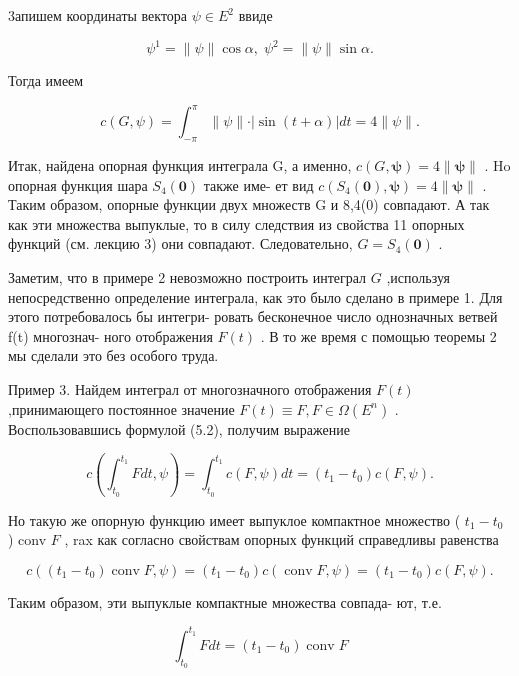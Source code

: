\documentclass[8pt]{extarticle}
\begin{document}
3апишем координаты вектора \(\psi  \in  {E}^{2}\) ввиде

\[
{\psi }^{1} = \parallel \psi \parallel \cos \alpha ,\;{\psi }^{2} = \parallel \psi \parallel \sin \alpha .
\]

Тогда имеем

\[
c\left( {G,\psi }\right)  = {\int }_{-\pi }^{\pi }\parallel \psi \parallel  \cdot  \left| {\sin \left( {t + \alpha }\right) }\right| {dt} = 4\parallel \psi \parallel .
\]

Итак, найдена опорная функция интеграла G, а именно, \(c\left( {G,\mathbf{\psi }}\right)  = 4\parallel \mathbf{\psi }\parallel\) . Ho опорная функция шара \({S}_{4}\left( \mathbf{0}\right)\) также име- ет вид \(c\left( {{S}_{4}\left( \mathbf{0}\right) ,\mathbf{\psi }}\right)  = 4\parallel \mathbf{\psi }\parallel\) . Таким образом, опорные функции двух множеств G и 8,4(0) совпадают. А так как эти множества выпуклые, то в силу следствия из свойства 11 опорных функций (см. лекцию 3) они совпадают. Следовательно, \(G = {S}_{4}\left( \mathbf{0}\right)\) .

Заметим, что в примере 2 невозможно построить интеграл \(G\) ,используя непосредственно определение интеграла, как это было сделано в примере 1. Для этого потребовалось бы интегри- ровать бесконечное число однозначных ветвей f(t) многознач- ного отображения \(F\left( t\right)\) . В то же время с помощью теоремы 2 мы сделали это без особого труда.

Пример 3. Найдем интеграл от многозначного отображения \(F\left( t\right)\) ,принимающего постоянное значение \(F\left( t\right)  \equiv  F,F \in  \Omega \left( {E}^{n}\right)\) . Воспользовавшись формулой (5.2), получим выражение

\[
c\left( {{\int }_{{t}_{0}}^{{t}_{1}}{Fdt},\psi }\right)  = {\int }_{{t}_{0}}^{{t}_{1}}c\left( {F,\psi }\right) {dt} = \left( {{t}_{1} - {t}_{0}}\right) c\left( {F,\psi }\right) .
\]

Но такую же опорную функцию имеет выпуклое компактное множество ( \({t}_{1} - {t}_{0}\) ) conv \(F\) , rax как согласно свойствам опорных функций справедливы равенства

\[
c\left( {\left( {{t}_{1} - {t}_{0}}\right) \operatorname{conv}F,\psi }\right)  = \left( {{t}_{1} - {t}_{0}}\right) c\left( {\operatorname{conv}F,\psi }\right)  = \left( {{t}_{1} - {t}_{0}}\right) c\left( {F,\psi }\right) .
\]

Таким образом, эти выпуклые компактные множества совпада- ют, т.е.

\[
{\int }_{{t}_{0}}^{{t}_{1}}{Fdt} = \left( {{t}_{1} - {t}_{0}}\right) \operatorname{conv}F
\]
\end{document}
